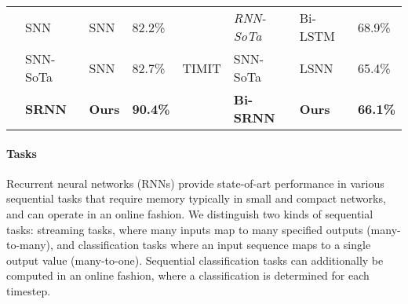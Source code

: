 \documentclass[fleqn,10pt]{wlscirep}
\begin{document}
\begin{table}[]
\begin{tabular}{|l|l|l|l|l|l|l|l|}
                         &SNN                               & SNN\cite{zenke2020remarkable} & 82.2\%                                       & \multirow{3}{*}{TIMIT} & \em  RNN-SoTa                                  & Bi-LSTM\cite{graves2005framewise}        & 68.9\%                                                       \\ \cline{2-4} \cline{6-8} 
                         &SNN-SoTa                               & SNN\cite{perez2021neural} & 82.7\%                                       &                        & SNN-SoTa                                                      & LSNN\cite{bellec2018long}                & 65.4\%                                                       \\ \cline{2-4} \cline{6-8} 
                         & \cellcolor{green}\bf SRNN & \cellcolor{green}\bf Ours          & \cellcolor{green}\bf 90.4\%  &                        & \cellcolor{green}\bf Bi-SRNN & \cellcolor{green}\bf Ours & \cellcolor{green}\bf 66.1\% \\ \hline
\end{tabular}
\label{tab:sota_acc}
\end{table}




\paragraph{Tasks} Recurrent neural networks (RNNs) provide state-of-art performance in various sequential tasks that require memory \cite{shewalkar2019performance} typically in small and compact networks, and can operate in an online fashion. We distinguish two kinds of sequential tasks: streaming tasks, where many inputs map to many specified outputs (many-to-many), and classification tasks where an input sequence maps to a single output value (many-to-one). Sequential classification tasks can additionally be computed in an online fashion, where a classification is determined for each timestep.
\end{document}
